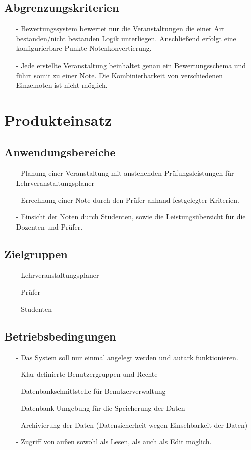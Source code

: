 		\subsection{Abgrenzungskriterien}
		\begin{itemize}
		\item[-]	Bewertungssystem bewertet nur die Veranstaltungen die einer Art bestanden/nicht bestanden Logik unterliegen. Anschließend erfolgt eine konfigurierbare Punkte-Notenkonvertierung.
		\item[-]	Jede erstellte Veranstaltung beinhaltet genau ein Bewertungsschema und führt somit zu einer Note. Die Kombinierbarkeit von verschiedenen Einzelnoten ist nicht möglich.
		\end{itemize}
		
	\section{Produkteinsatz}
	
		
		\subsection{Anwendungsbereiche}
		\begin{itemize}
		\item[-]	Planung einer Veranstaltung mit anstehenden Prüfungsleistungen für Lehrveranstaltungsplaner
		\item[-]	Errechnung einer Note durch den Prüfer anhand festgelegter Kriterien.
		\item[-]	Einsicht der Noten durch Studenten, sowie die Leistungsübersicht für die Dozenten und Prüfer.
		\end{itemize}
		
		
		\subsection{Zielgruppen}
		\begin{itemize}
		\item[-]	Lehrveranstaltungsplaner
		\item[-]	Prüfer
		\item[-]	Studenten
		\end{itemize}

		\subsection{Betriebsbedingungen}
		\begin{itemize}
		\item[-]	Das System soll nur einmal angelegt werden und autark funktionieren.
		\item[-]	Klar definierte Benutzergruppen und Rechte
		\item[-]	Datenbankschnittstelle für Benutzerverwaltung
		\item[-]	Datenbank-Umgebung für die Speicherung der Daten
		\item[-]	Archivierung der Daten (Datensicherheit wegen Einsehbarkeit der Daten)
		\item[-]	Zugriff von außen sowohl als Lesen, als auch als Edit möglich. 
		\end{itemize}

